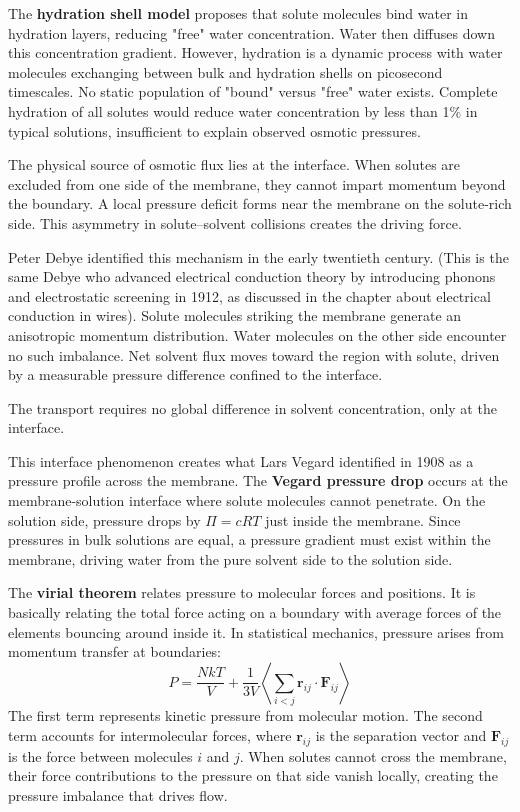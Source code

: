 The \textbf{hydration shell model} proposes that solute molecules bind water in hydration layers, reducing "free" water concentration. Water then diffuses down this concentration gradient. However, hydration is a dynamic process with water molecules exchanging between bulk and hydration shells on picosecond timescales. No static population of "bound" versus "free" water exists. Complete hydration of all solutes would reduce water concentration by less than 1\% in typical solutions, insufficient to explain observed osmotic pressures.

The physical source of osmotic flux lies at the interface. When solutes are excluded from one side of the membrane, they cannot impart momentum beyond the boundary. A local pressure deficit forms near the membrane on the solute-rich side. This asymmetry in solute–solvent collisions creates the driving force.

Peter Debye identified this mechanism in the early twentieth century. (This is the same Debye who advanced electrical conduction theory by introducing phonons and electrostatic screening in 1912, as discussed in the chapter about electrical conduction in wires). Solute molecules striking the membrane generate an anisotropic momentum distribution. Water molecules on the other side encounter no such imbalance. Net solvent flux moves toward the region with solute, driven by a measurable pressure difference confined to the interface.

The transport requires no global difference in solvent concentration, only at the interface.

This interface phenomenon creates what Lars Vegard identified in 1908 as a pressure profile across the membrane. The \textbf{Vegard pressure drop} occurs at the membrane-solution interface where solute molecules cannot penetrate. On the solution side, pressure drops by $\Pi = cRT$ just inside the membrane. Since pressures in bulk solutions are equal, a pressure gradient must exist within the membrane, driving water from the pure solvent side to the solution side.

The \textbf{virial theorem} relates pressure to molecular forces and positions. It is basically relating the total force acting on a boundary with average forces of the elements bouncing around inside it. In statistical mechanics, pressure arises from momentum transfer at boundaries:
\[
P = \frac{NkT}{V} + \frac{1}{3V}\left\langle \sum_{i<j} \mathbf{r}_{ij} \cdot \mathbf{F}_{ij} \right\rangle
\]
The first term represents kinetic pressure from molecular motion. The second term accounts for intermolecular forces, where $\mathbf{r}_{ij}$ is the separation vector and $\mathbf{F}_{ij}$ is the force between molecules $i$ and $j$. When solutes cannot cross the membrane, their force contributions to the pressure on that side vanish locally, creating the pressure imbalance that drives flow.

